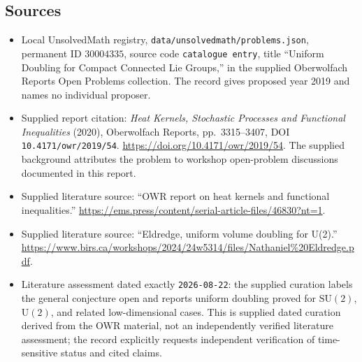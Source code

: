 \documentclass[11pt]{article}
\begin{document}
\subsection{Sources}
\begin{itemize}
\item Local UnsolvedMath registry, \texttt{data/unsolvedmath/problems.json}, permanent ID \(30004335\), source code \texttt{catalogue entry}, title ``Uniform Doubling for Compact Connected Lie Groups,'' in the supplied Oberwolfach Reports Open Problems collection. The record gives proposed year 2019 and names no individual proposer.
\item Supplied report citation: \emph{Heat Kernels, Stochastic Processes and Functional Inequalities} (2020), Oberwolfach Reports, pp.\ 3315--3407, DOI \texttt{10.4171/owr/2019/54}. \url{https://doi.org/10.4171/owr/2019/54}. The supplied background attributes the problem to workshop open-problem discussions documented in this report.
\item Supplied literature source: ``OWR report on heat kernels and functional inequalities.'' \url{https://ems.press/content/serial-article-files/46830?nt=1}.
\item Supplied literature source: ``Eldredge, uniform volume doubling for U(2).'' \url{https://www.birs.ca/workshops/2024/24w5314/files/Nathaniel%20Eldredge.pdf}.
\item Literature assessment dated exactly \texttt{2026-08-22}: the supplied curation labels the general conjecture open and reports uniform doubling proved for \(\mathrm{SU}(2)\), \(\mathrm{U}(2)\), and related low-dimensional cases. This is supplied dated curation derived from the OWR material, not an independently verified literature assessment; the record explicitly requests independent verification of time-sensitive status and cited claims.
\end{itemize}
\end{document}
